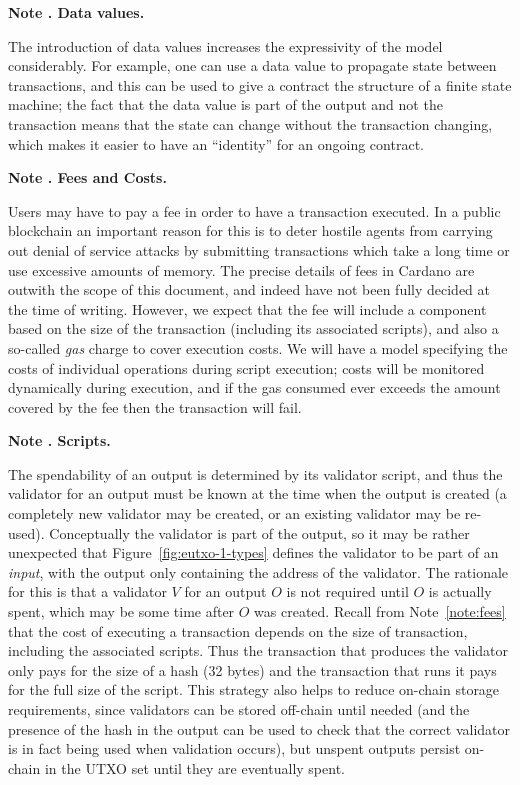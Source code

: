 \documentclass[a4paper]{article}
\newcounter{note}
\newcommand{\note}[1]{
  \bigskip
  \refstepcounter{note}
  \noindent\textbf{Note \thenote. #1}
}
\begin{document}
\note{Data values.}
\label{note:data-values}
The introduction of data values
increases the expressivity of the model considerably. For example,
one can use a data value to propagate state between
transactions, and this can be used to give a contract the structure
of a finite state machine; the fact that the data value is part
of the output and not the transaction means that the state can
change without the transaction changing, which makes it easier to
have an ``identity'' for an ongoing contract.

\note{Fees and Costs.}
\label{note:fees}
Users may have to pay a fee in order to have a transaction executed.
In a public blockchain an important reason for this is to deter
hostile agents from carrying out denial of service attacks by
submitting transactions which take a long time or use excessive
amounts of memory.  The precise details of fees in Cardano are outwith
the scope of this document, and indeed have not been fully decided at
the time of writing. However, we expect that the fee will include a
component based on the size of the transaction (including its
associated scripts), and also a so-called \textit{gas} charge to cover
execution costs.  We will have a model specifying the costs of
individual operations during script execution; costs will be monitored
dynamically during execution, and if the gas consumed ever exceeds the
amount covered by the fee then the transaction will fail.

\note{Scripts.}
\label{note:scripts} The spendability of an output is determined by
its validator script, and thus the validator for an output must be
known at the time when the output is created (a completely new validator
may be created, or an existing validator may be re-used).
Conceptually the validator is part of the output, so it may be rather
unexpected that Figure~\ref{fig:eutxo-1-types} defines the validator
to be part of an \textit{input}, with the output only containing the
address of the validator.  The rationale for this is that a validator
$V$ for an output $O$ is not required until $O$ is actually spent,
which may be some time after $O$ was created.  Recall from
Note~\ref{note:fees} that the cost of executing a transaction depends
on the size of transaction, including the associated scripts.  Thus
the transaction that produces the validator only pays for the size of
a hash (32 bytes) and the transaction that runs it pays for the full
size of the script. This strategy also helps to reduce on-chain
storage requirements, since validators can be stored off-chain until
needed (and the presence of the hash in the output can be used to
check that the correct validator is in fact being used when validation
occurs), but unspent outputs persist on-chain in the UTXO set until
they are eventually spent.
\end{document}
